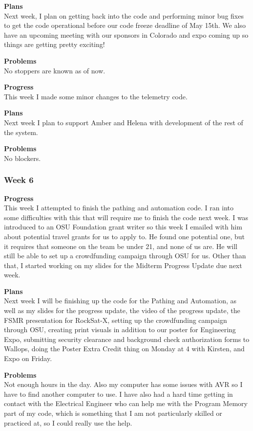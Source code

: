 \textbf{Plans} \\ 
Next week, I plan on getting back into the code and performing minor bug fixes to get the code operational before our code freeze deadline of May 15th. 
We also have an upcoming meeting with our sponsors in Colorado and expo coming up so things are getting pretty exciting!

\textbf{Problems} \\
No stoppers are known as of now.

\textbf{Progress} \\
This week I made some minor changes to the telemetry code.

\textbf{Plans} \\
Next week I plan to support Amber and Helena with development of the rest of the system.

\textbf{Problems} \\
No blockers.

\subsubsection{Week 6}
\textbf{Progress} \\ 
This week I attempted to finish the pathing and automation code. I ran into some difficulties with this that will require me to finish the code next week. I was introduced to an OSU Foundation grant writer so this week I emailed with him about potential travel grants for us to apply to. He found one potential one, but it requires that someone on the team be under 21, and none of us are. He will still be able to set up a crowdfunding campaign through OSU for us. Other than that, I started working on my slides for the Midterm Progress Update due next week.

\textbf{Plans} \\ 
Next week I will be finishing up the code for the Pathing and Automation, as well as my slides for the progress update, the video of the progress update, the FSMR presentation for RockSat-X, setting up the crowdfunding campaign through OSU, creating print visuals in addition to our poster for Engineering Expo, submitting security clearance and background check authorization forms to Wallops, doing the Poster Extra Credit thing on Monday at 4 with Kirsten, and Expo on Friday.

\textbf{Problems} \\ 
Not enough hours in the day. Also my computer has some issues with AVR so I have to find another computer to use. I have also had a hard time getting in contact with the Electrical Engineer who can help me with the Program Memory part of my code, which is something that I am not particularly skilled or practiced at, so I could really use the help.

